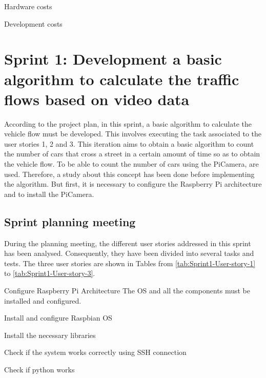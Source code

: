 \begin{table}[hp]
	\centering
	{\small
		
	}
	\caption{Hardware costs}
	\label{tab:Hardware-Costs}
\end{table}

\begin{table}[hp]
	\centering
	{\small
		
	}
	\caption{Development costs}
	\label{tab:Development-Costs}
\end{table}



\section{Sprint 1: Development a basic algorithm to calculate the traffic flows based on video data}
\label{Section:Sprint1}
According to the project plan, in this sprint, a basic algorithm to calculate the vehicle flow must be developed. This involves executing the task associated to the user stories 1, 2 and 3. This iteration aims to obtain a basic algorithm to count the number of cars that cross a street in a certain amount of time so as to obtain the vehicle flow.  To be able to count the number of cars using the PiCamera,  are used. Therefore, a study about this concept has been done before implementing the algorithm. But first, it is necessary to configure the Raspberry Pi architecture and to install the PiCamera. 

\subsection{Sprint planning meeting}
During the planning meeting, the different user stories addressed in this sprint has been analysed. Consequently, they have been divided into several tasks and tests. The three user stories are shown in Tables from \ref{tab:Sprint1-User-story-1} to \ref{tab:Sprint1-User-story-3}.

{Configure Raspberry Pi Architecture}
{The \ac{OS} and all the components must be installed and configured.}
{	\item Install and configure Raspbian \ac{OS}
	\item Install the necessary libraries
}{	\item Check if the system works correctly using SSH connection
	\item Check if python works
}

